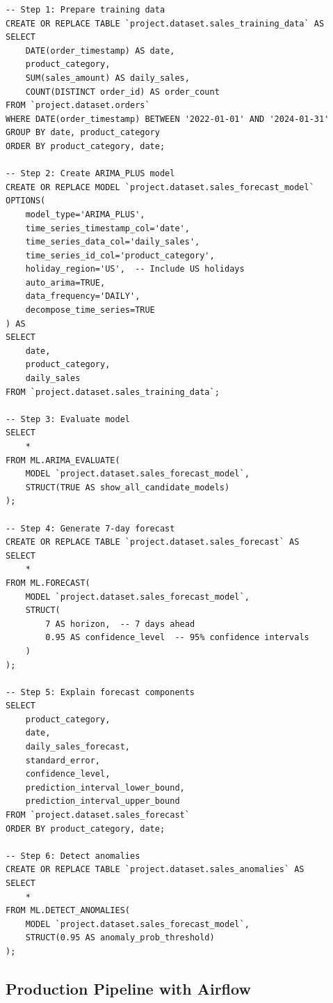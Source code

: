 \begin{lstlisting}[style=sql, caption=BigQuery ML ARIMA\_PLUS Time Series Forecast]
-- Step 1: Prepare training data
CREATE OR REPLACE TABLE `project.dataset.sales_training_data` AS
SELECT
    DATE(order_timestamp) AS date,
    product_category,
    SUM(sales_amount) AS daily_sales,
    COUNT(DISTINCT order_id) AS order_count
FROM `project.dataset.orders`
WHERE DATE(order_timestamp) BETWEEN '2022-01-01' AND '2024-01-31'
GROUP BY date, product_category
ORDER BY product_category, date;

-- Step 2: Create ARIMA_PLUS model
CREATE OR REPLACE MODEL `project.dataset.sales_forecast_model`
OPTIONS(
    model_type='ARIMA_PLUS',
    time_series_timestamp_col='date',
    time_series_data_col='daily_sales',
    time_series_id_col='product_category',
    holiday_region='US',  -- Include US holidays
    auto_arima=TRUE,
    data_frequency='DAILY',
    decompose_time_series=TRUE
) AS
SELECT
    date,
    product_category,
    daily_sales
FROM `project.dataset.sales_training_data`;

-- Step 3: Evaluate model
SELECT
    *
FROM ML.ARIMA_EVALUATE(
    MODEL `project.dataset.sales_forecast_model`,
    STRUCT(TRUE AS show_all_candidate_models)
);

-- Step 4: Generate 7-day forecast
CREATE OR REPLACE TABLE `project.dataset.sales_forecast` AS
SELECT
    *
FROM ML.FORECAST(
    MODEL `project.dataset.sales_forecast_model`,
    STRUCT(
        7 AS horizon,  -- 7 days ahead
        0.95 AS confidence_level  -- 95% confidence intervals
    )
);

-- Step 5: Explain forecast components
SELECT
    product_category,
    date,
    daily_sales_forecast,
    standard_error,
    confidence_level,
    prediction_interval_lower_bound,
    prediction_interval_upper_bound
FROM `project.dataset.sales_forecast`
ORDER BY product_category, date;

-- Step 6: Detect anomalies
CREATE OR REPLACE TABLE `project.dataset.sales_anomalies` AS
SELECT
    *
FROM ML.DETECT_ANOMALIES(
    MODEL `project.dataset.sales_forecast_model`,
    STRUCT(0.95 AS anomaly_prob_threshold)
);
\end{lstlisting}

\subsection{Production Pipeline with Airflow}

